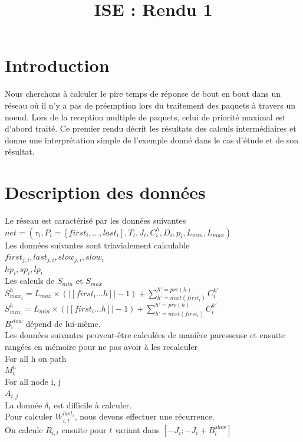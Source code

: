 \documentclass[10pt,a4paper]{article}
\title{ISE : Rendu 1}
\begin{document}
\maketitle

\section{Introduction}
Nous cherchons à calculer le pire temps de réponse de bout en bout dans un réseau où il n'y a pas de préemption lors du traitement des paquets à travers un noeud. Lors de la reception multiple de paquets, celui de priorité maximal est d'abord traité. Ce premier rendu décrit les résultats des calculs intermédiaires et donne une interprétation simple de l'exemple donné dans le cas d'étude et de son résultat.

\section{Description des données}
Le réseau est caractérisé par les données suivantes\\
$net=(\tau_i, P_i = [first_i,...,last_i], T_i, J_i, C_i^h, D_i, p_i, L_{min}, L_{max})$\\

Les données suivantes sont triavialement calculable\\
$first_{j,i}, last_{j,i}, slow_{j,i}, slow_i$\\
$hp_i, sp_i, lp_i$\\

Les calculs de $S_{min}$ et $S_{max}$\\
$S_{max_i}^h = L_{max} \times (|[first_i ... h]| - 1) + \sum 
\limits_{h'=next(first_i)}^{h'=pre(h)}C_i^{h'}$ \\
$S_{min_i}^h = L_{min} \times (|[first_i ... h]| - 1) + \sum 
\limits_{h'=next(first_i)}^{h'=pre(h)}C_i^{h'}$ \\
$B_{i}^{slow}$ dépend de lui-même.\\

Les données suivantes peuvent-être calculées de manière paresseuse et ensuite rangées en mémoire pour ne pas avoir à les recalculer\\
For all h on path\\
$M_i^{h}$\\
For all node i, j\\
$A_{i,j}$\\

La donnée $\delta_i$ est difficile à calculer.\\
Pour calculer $W_{i,t}^{last_i}$, nous devons effectuer une récurrence.\\
On calcule $R_{i,t}$ ensuite pour $t$ variant dans $[-J_i;-J_i+B_i^{slow}]$\\
\end{document}
